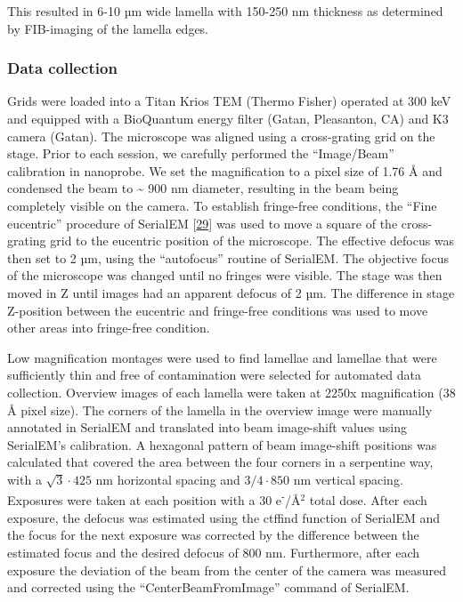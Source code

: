 \documentclass[
]{article}
\begin{document}
This resulted in 6-10 µm wide lamella with 150-250 nm thickness as determined by
FIB-imaging of the lamella edges.

\hypertarget{data-collection}{%
\subsubsection{Data collection}\label{data-collection}}

Grids were loaded into a Titan Krios TEM (Thermo Fisher) operated at 300 keV and
equipped with a BioQuantum energy filter (Gatan, Pleasanton, CA) and K3 camera (Gatan). The
microscope was aligned using a cross-grating grid on the stage. Prior to each
session, we carefully performed the ``Image/Beam'' calibration in nanoprobe. We
set the magnification to a pixel size of 1.76 Å and condensed the beam to \textasciitilde{} 900 nm
diameter, resulting in the beam being completely visible on the camera. To
establish fringe-free conditions, the ``Fine eucentric'' procedure of SerialEM {[}\protect\hyperlink{ref-19ZFerhph}{29}{]} was
used to move a square of the cross-grating grid to the eucentric position of the
microscope. The effective defocus was then set to 2 µm, using the ``autofocus''
routine of SerialEM. The objective focus of the microscope was changed until no
fringes were visible. The stage was then moved in Z until images had an apparent
defocus of 2 µm. The difference in stage Z-position between the eucentric and
fringe-free conditions was used to move other areas into fringe-free condition.

Low magnification montages were used to find lamellae and lamellae that were
sufficiently thin and free of contamination were selected for automated data
collection. Overview images of each lamella were taken at 2250x magnification
(38 Å pixel size). The corners of the lamella in the overview image were manually
annotated in SerialEM and translated into beam image-shift values using SerialEM's
calibration. A hexagonal pattern of beam image-shift positions was calculated
that covered the area between the four corners in a serpentine way, with a
\(\sqrt{3}\cdot425\) nm horizontal spacing and \(3/4\cdot 850\) nm vertical spacing. Exposures were
taken at each position with a 30 e\textsuperscript{-}/Å\(^2\) total dose. After each exposure, the
defocus was estimated using the ctffind function of SerialEM and the focus for
the next exposure was corrected by the difference between the estimated focus
and the desired defocus of 800 nm. Furthermore, after each exposure the
deviation of the beam from the center of the camera was measured and corrected
using the ``CenterBeamFromImage'' command of SerialEM.
\end{document}
